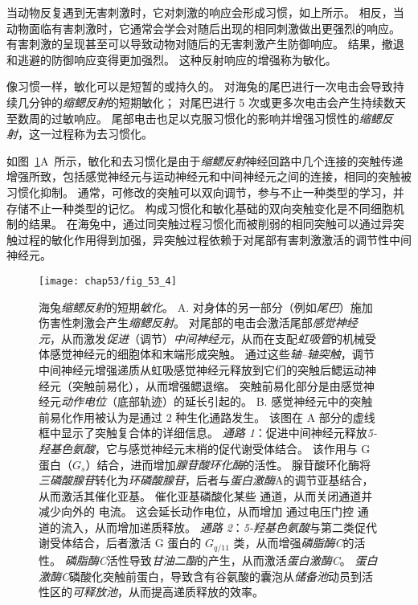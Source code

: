 当动物反复遇到无害刺激时，它对刺激的响应会形成习惯，如上所示。
相反，当动物面临有害刺激时，它通常会学会对随后出现的相同刺激做出更强烈的响应。
有害刺激的呈现甚至可以导致动物对随后的无害刺激产生防御响应。
结果，撤退和逃避的防御响应变得更加强烈。
这种反射响应的增强称为敏化。



像习惯一样，敏化可以是短暂的或持久的。
对海兔的尾巴进行一次电击会导致持续几分钟的\textit{缩鳃反射}的短期敏化；
对尾巴进行 5 次或更多次电击会产生持续数天至数周的过敏响应。
尾部电击也足以克服习惯化的影响并增强习惯性的\textit{缩鳃反射}，这一过程称为去习惯化。


如图~\ref{fig:53_4}A~所示，敏化和去习惯化是由于\textit{缩鳃反射}神经回路中几个连接的突触传递增强所致，包括感觉神经元与运动神经元和中间神经元之间的连接，相同的突触被习惯化抑制。
通常，可修改的突触可以双向调节，参与不止一种类型的学习，并存储不止一种类型的记忆。
构成习惯化和敏化基础的双向突触变化是不同细胞机制的结果。
在海兔中，通过同突触过程习惯化而被削弱的相同突触可以通过异突触过程的敏化作用得到加强，异突触过程依赖于对尾部有害刺激激活的调节性中间神经元。


\begin{figure}[htbp]
	\centering
	\texttt{[image: chap53/fig\_53\_4]}
	\caption{海兔\textit{缩鳃反射}的短期\textit{敏化}。
		A. 对身体的另一部分（例如\textit{尾巴}）施加伤害性刺激会产生\textit{缩鳃反射}。
		对尾部的电击会激活尾部\textit{感觉神经元}，从而激发\textit{促进}（调节）\textit{中间神经元}，从而在支配\textit{虹吸管}的机械受体感觉神经元的细胞体和末端形成突触。
		通过这些\textit{轴–轴突触}，调节中间神经元增强递质从虹吸感觉神经元释放到它们的突触后鳃运动神经元（突触前易化），从而增强鳃退缩。
		突触前易化部分是由感觉神经元\textit{动作电位}（底部轨迹）的延长引起的\cite{pinsker1970habituation,klein1980mechanism}。
		B. 感觉神经元中的突触前易化作用被认为是通过 2 种生化通路发生。
		该图在 A 部分的虚线框中显示了突触复合体的详细信息。
		\textit{通路 1}：促进中间神经元释放\textit{5-羟基色氨酸}，它与感觉神经元末梢的促代谢受体结合。
		该作用与 G 蛋白（$ G_s $）结合，进而增加\textit{腺苷酸环化酶}的活性。
		腺苷酸环化酶将\textit{三磷酸腺苷}转化为\textit{环磷酸腺苷}，后者与\textit{蛋白激酶}A的调节亚基结合，从而激活其催化亚基。
		催化亚基磷酸化某些  通道，从而关闭通道并减少向外的  电流。
		这会延长动作电位，从而增加  通过电压门控  通道的流入，从而增加递质释放。
		\textit{通路 2}：\textit{5-羟基色氨酸}与第二类促代谢受体结合，后者激活 G 蛋白的 $ G_{q/11} $ 类，从而增强\textit{磷脂酶C}的活性。
		\textit{磷脂酶C}活性导致\textit{甘油二酯}的产生，从而激活\textit{蛋白激酶C}。
		\textit{蛋白激酶C}磷酸化突触前蛋白，导致含有谷氨酸的囊泡从\textit{储备池}动员到活性区的\textit{可释放池}，从而提高递质释放的效率。}
	\label{fig:53_4}
\end{figure}



